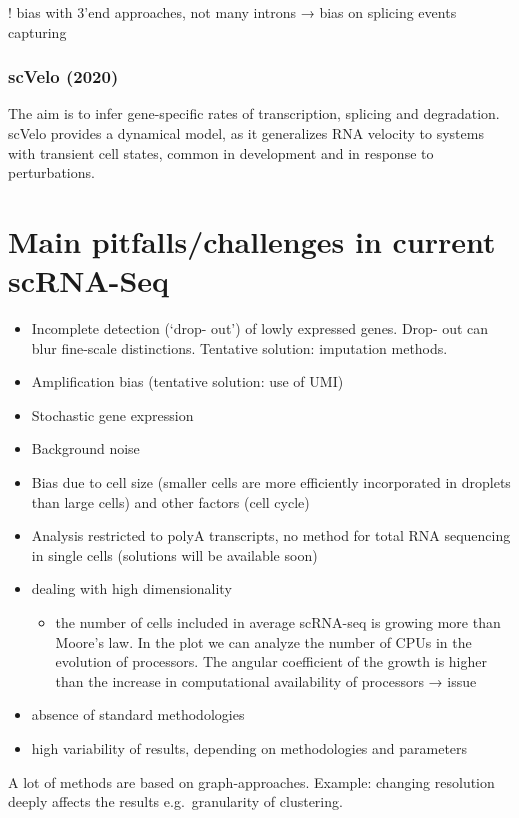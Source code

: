 ! bias with 3'end approaches, not many introns → bias on splicing events
capturing

\hypertarget{scvelo-2020}{%
\subsubsection{scVelo (2020)}\label{scvelo-2020}}

The aim is to infer gene-specific rates of transcription, splicing and
degradation. scVelo provides a dynamical model, as it generalizes RNA
velocity to systems with transient cell states, common in development
and in response to perturbations.

\hypertarget{main-pitfallschallenges-in-current-scrna-seq}{%
\section{Main pitfalls/challenges in current
scRNA-Seq}\label{main-pitfallschallenges-in-current-scrna-seq}}

\begin{itemize}
\tightlist
\item
  Incomplete detection (`drop- out') of lowly expressed genes. Drop- out
  can blur fine-scale distinctions. Tentative solution: imputation
  methods.
\item
  Amplification bias (tentative solution: use of UMI)
\item
  Stochastic gene expression
\item
  Background noise
\item
  Bias due to cell size (smaller cells are more efficiently incorporated
  in droplets than large cells) and other factors (cell cycle)
\item
  Analysis restricted to polyA transcripts, no method for total RNA
  sequencing in single cells (solutions will be available soon)
\item
  dealing with high dimensionality

  \begin{itemize}
  \tightlist
  \item
    the number of cells included in average scRNA-seq is growing more
    than Moore's law. In the plot we can analyze the number of CPUs in
    the evolution of processors. The angular coefficient of the growth
    is higher than the increase in computational availability of
    processors → issue
  \end{itemize}
\item
  absence of standard methodologies
\item
  high variability of results, depending on methodologies and parameters
\end{itemize}

A lot of methods are based on graph-approaches. Example: changing
resolution deeply affects the results e.g.~granularity of clustering.
